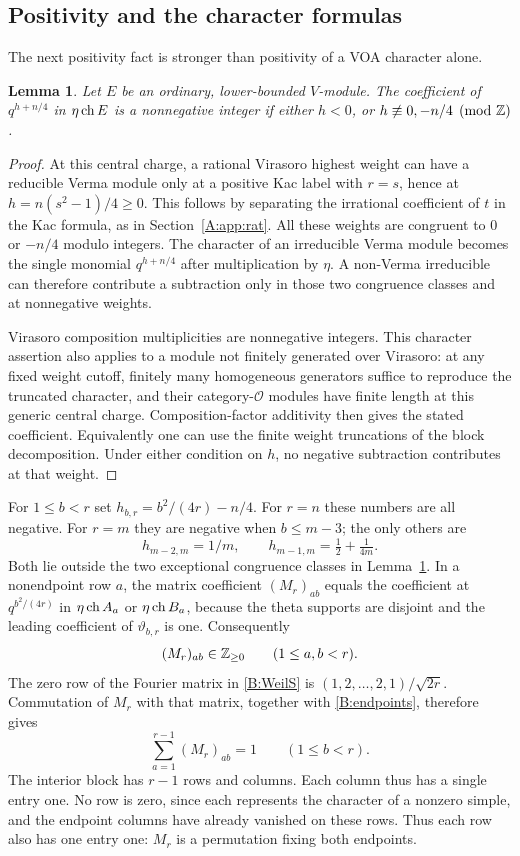 \documentclass[11pt]{article}
\newtheorem{lemma}[theorem]{Lemma}
\numberwithin{equation}{section}
\begin{document}
\subsection{Positivity and the character formulas}
The next positivity fact is stronger than positivity of a VOA character alone.
\begin{lemma}\label{B:Virpositive}
Let $E$ be an ordinary, lower-bounded $V$-module. The coefficient of $q^{h+n/4}$ in $\eta\operatorname{ch} E$ is a nonnegative integer if either $h<0$, or $h\not\equiv0,-n/4\pmod{\mathbb Z}$.
\end{lemma}
\begin{proof}
At this central charge, a rational Virasoro highest weight can have a reducible Verma module only at a positive Kac label with $r=s$, hence at
$h=n(s^2-1)/4\geq0$. This follows by separating the irrational coefficient of $t$ in the Kac formula, as in Section~\ref{A:app:rat}. All these weights are congruent to $0$ or $-n/4$ modulo integers. The character of an irreducible Verma module becomes the single monomial $q^{h+n/4}$ after multiplication by $\eta$. A non-Verma irreducible can therefore contribute a subtraction only in those two congruence classes and at nonnegative weights.

Virasoro composition multiplicities are nonnegative integers. This character assertion also applies to a module not finitely generated over Virasoro: at any fixed weight cutoff, finitely many homogeneous generators suffice to reproduce the truncated character, and their category-$\mathcal O$ modules have finite length at this generic central charge. Composition-factor additivity then gives the stated coefficient. Equivalently one can use the finite weight truncations of the block decomposition. Under either condition on $h$, no negative subtraction contributes at that weight.
\end{proof}

For $1\leq b<r$ set $h_{b,r}=b^2/(4r)-n/4$. For $r=n$ these numbers are all negative. For $r=m$ they are negative when $b\leq m-3$; the only others are
\[
 h_{m-2,m}=1/m,\qquad h_{m-1,m}=\tfrac12+\tfrac1{4m}.
\]
Both lie outside the two exceptional congruence classes in Lemma~\ref{B:Virpositive}. In a nonendpoint row $a$, the matrix coefficient $(M_r)_{ab}$ equals the coefficient at $q^{b^2/(4r)}$ in $\eta\operatorname{ch} A_a$ or $\eta\operatorname{ch} B_a$, because the theta supports are disjoint and the leading coefficient of $\vartheta_{b,r}$ is one. Consequently
\[
 (M_r)_{ab}\in\mathbb Z_{\geq0}\qquad(1\leq a,b<r).
\]
The zero row of the Fourier matrix in \eqref{B:WeilS} is
$(1,2,\ldots,2,1)/\sqrt{2r}$. Commutation of $M_r$ with that matrix, together with \eqref{B:endpoints}, therefore gives
\[
 \sum_{a=1}^{r-1}(M_r)_{ab}=1\qquad(1\leq b<r).
\]
The interior block has $r-1$ rows and columns. Each column thus has a single entry one. No row is zero, since each represents the character of a nonzero simple, and the endpoint columns have already vanished on these rows. Thus each row also has one entry one: $M_r$ is a permutation fixing both endpoints.
\end{document}
